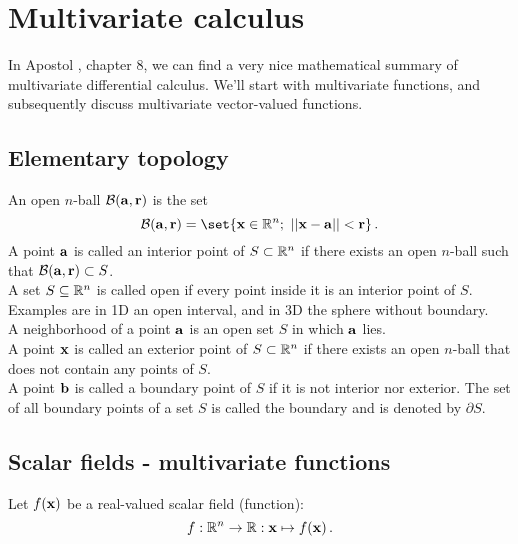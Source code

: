 \section{Multivariate calculus}
    In Apostol \cite{Apostol1969}, chapter 8, we can find a very nice mathematical summary of multivariate differential calculus. We'll start with multivariate functions, and subsequently discuss multivariate vector-valued functions.

    \subsection{Elementary topology}
        An open $n$-ball $\mathcal{B}(\vb{a}, \vb{r})$ is the set
        \begin{equation}
            \mathcal{B}(\vb{a}, \vb{r}) = \set{\vb{x} \in \R^n ; \thinspace \thinspace||\vb{x} - \vb{a}|| < \vb{r}} \thinspace .
        \end{equation}
        A point $\vb{a}$ is called an interior point of $S \subset \mathbb{R}^n$ if there exists an open $n$-ball such that \mbox{$\mathcal{B}(\vb{a}, \vb{r}) \subset S$}. \\

        A set $S \subseteq \mathbb{R}^n$ is called open if every point inside it is an interior point of $S$. Examples are in 1D an open interval, and in 3D the sphere without boundary. \\

        A neighborhood of a point $\vb{a}$ is an open set $S$ in which $\vb{a}$ lies. \\

        A point $\vb{x}$ is called an exterior point of $S \subset \mathbb{R}^n$ if there exists an open $n$-ball that does not contain any points of $S$. \\

        A point $\vb{b}$ is called a boundary point of $S$ if it is not interior nor exterior. The set of all boundary points of a set $S$ is called the boundary and is denoted by $\partial S$.

    \subsection{Scalar fields - multivariate functions}
        Let $f(\vb{x})$ be a real-valued scalar field (function):
        \begin{equation}
            f: \mathbb{R}^n \rightarrow \mathbb{R}: \vb{x} \mapsto f(\vb{x}) \thinspace .
        \end{equation}


